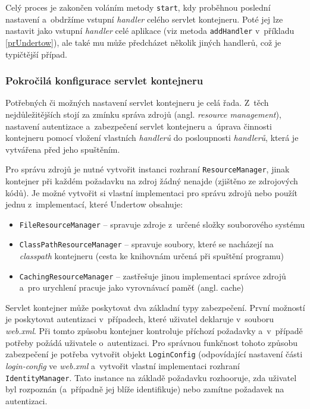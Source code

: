                 Celý proces je zakončen voláním metody \texttt{start}, kdy proběhnou poslední nastavení a~obdržíme 
                vstupní \emph{handler} celého servlet kontejneru.
                Poté jej lze nastavit jako vstupní \emph{handler} celé aplikace
                (viz metoda \texttt{addHandler} v~příkladu \ref{prUndertow}), ale také mu může předcházet několik jiných handlerů,
                což je typičtější případ.


            \subsubsection{Pokročilá konfigurace servlet kontejneru}
                Potřebných či možných nastavení servlet kontejneru je celá řada. Z~těch nejdůležitějších stojí za zmínku 
                správa zdrojů (angl. \emph{resource management}), nastavení autentizace a~zabezpečení servlet kontejneru
                a~úprava činnosti kontejneru pomocí vložení vlastních \emph{handlerů} do posloupnosti \emph{handlerů},
                která je vytvářena před jeho spuštěním.

                Pro správu zdrojů je nutné vytvořit instanci rozhraní \texttt{ResourceManager}, jinak kontejner při 
                každém požadavku na zdroj žádný nenajde (zjištěno ze zdrojových kódů). Je možné vytvořit si vlastní
                implementaci pro správu zdrojů nebo použít jednu z~implementací, které Undertow obsahuje:

                \begin{itemize}
                    \item \texttt{FileResourceManager} -- spravuje zdroje z~určené složky souborového systému
                    \item \texttt{ClassPathResourceManager}  -- spravuje soubory, které se nacházejí na \emph{classpath} kontejneru 
                        (cesta ke knihovnám určená při spuštění programu)
                    \item \texttt{CachingResourceManager} -- zastřešuje jinou implementaci správce zdrojů a~pro
                        urychlení pracuje jako vyrovnávací paměť (angl. cache)
                \end{itemize}

                Servlet kontejner může poskytovat dva základní typy zabezpečení. 
                První možností je poskytovat autentizaci v~případech, které uživatel deklaruje v~souboru
                \emph{web.xml}. Při tomto způsobu kontejner kontroluje příchozí požadavky a~v~případě
                potřeby požádá uživatele o~autentizaci. Pro správnou funkčnost tohoto způsobu zabezpečení
                je potřeba vytvořit objekt \texttt{LoginConfig} \cite{undertowServletSecurity} (odpovídající
                nastavení části \emph{login-config} ve \emph{web.xml} a~vytvořit vlastní implementaci
                rozhraní \texttt{IdentityManager}. Tato instance na základě požadavku rozhooruje, zda
                uživatel byl rozpoznán (a~případně jej blíže identifikuje) nebo zamítne požadavek na autentizaci.
                
